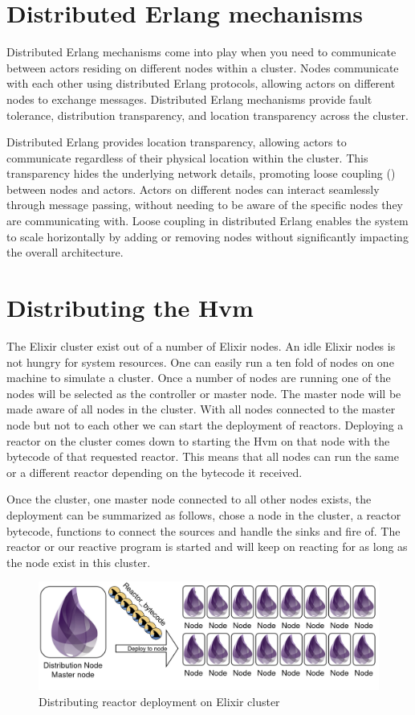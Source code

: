 \documentclass[a4paper]{book}
\begin{document}
\section{Distributed Erlang mechanisms}
Distributed Erlang mechanisms come into play when you need to communicate between actors residing on different nodes within a cluster.
Nodes communicate with each other using distributed Erlang protocols, allowing actors on different nodes to exchange messages. Distributed Erlang mechanisms provide fault tolerance, distribution transparency, and location transparency across the cluster. 

Distributed Erlang provides location transparency, allowing actors to communicate regardless of their physical location within the cluster. This transparency hides the underlying network details, promoting loose coupling (\cite{DBLP:conf/tools/CarretonMCM10}) between nodes and actors. Actors on different nodes can interact seamlessly through message passing, without needing to be aware of the specific nodes they are communicating with. Loose coupling in distributed Erlang enables the system to scale horizontally by adding or removing nodes without significantly impacting the overall architecture.

\section{Distributing the Hvm}
The Elixir cluster exist out of a number of Elixir nodes. An idle Elixir nodes is not hungry for system resources. One can easily run a ten fold of nodes on one machine to simulate a cluster. Once a number of nodes are running one of the nodes will be selected as the controller or master node. The master node will be made aware of all nodes in the cluster. With all nodes connected to the master node but not to each other we can start the deployment of reactors. Deploying a reactor on the cluster comes down to starting the Hvm on that node with the bytecode of that requested reactor. This means that all nodes can run the same or a different reactor depending on the bytecode it received. 

Once the cluster, one master node connected to all other nodes exists, the deployment can be summarized as follows, chose a node in the cluster, a reactor bytecode, functions to connect the sources and handle the sinks and fire of. The reactor or our reactive program is started and will keep on reacting for as long as the node exist in this cluster. 

\begin{figure}[h]
	\caption{Distributing reactor deployment on Elixir cluster}
	\includegraphics[width=\textwidth]{distribution300.drawio}
\end{figure}  
\end{document}
